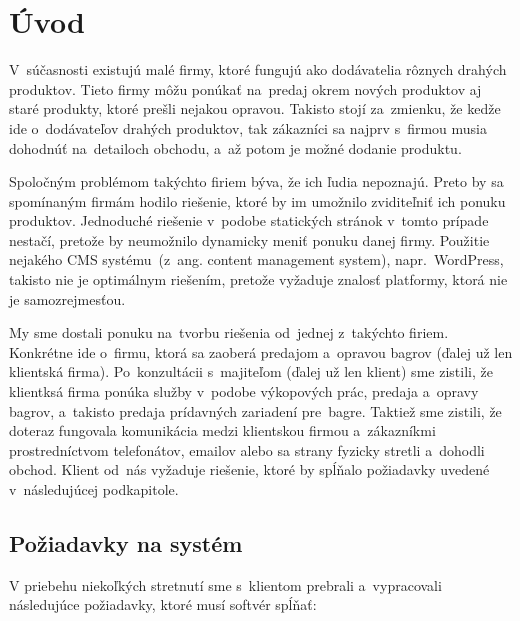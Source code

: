\chapter{Úvod}

V~súčasnosti existujú malé firmy, ktoré fungujú ako dodávatelia rôznych drahých produktov. Tieto firmy môžu ponúkať na~predaj okrem nových produktov aj staré produkty, ktoré prešli nejakou opravou. Takisto stojí za~zmienku, že kedže ide o~dodávateľov drahých produktov, tak zákazníci sa najprv s~firmou musia dohodnúť na~detailoch obchodu, a~až potom je možné dodanie produktu.

Spoločným problémom takýchto firiem býva, že ich ľudia nepoznajú. Preto by sa spomínaným firmám hodilo riešenie, ktoré by im umožnilo zviditeľniť ich ponuku produktov. Jednoduché riešenie v~podobe statických stránok v~tomto prípade nestačí, pretože by neumožnilo dynamicky meniť ponuku danej firmy. Použitie nejakého CMS systému~(z~ang. content management system), napr.~Word\-Press, takisto nie je optimálnym riešením, pretože vyžaduje znalosť platformy, ktorá nie je samozrejmesťou.

My sme dostali ponuku na~tvorbu riešenia od~jednej z~takýchto firiem. Konkrétne ide o~firmu, ktorá sa zaoberá predajom a~opravou bagrov (ďalej už len klientská firma). Po~konzultácii s~majiteľom (ďalej už len klient) sme zistili, že klientksá firma ponúka služby v~podobe výkopových prác, predaja a~opravy bagrov, a~takisto predaja prídavných zariadení pre~bagre. Taktiež sme zistili, že doteraz fungovala komunikácia medzi klientskou firmou a~zákazníkmi prostredníctvom telefonátov, emailov alebo sa strany fyzicky stretli a~dohodli obchod. Klient od~nás vyžaduje riešenie, ktoré by spĺňalo požiadavky uvedené v~následujúcej podkapitole.

\section{Požiadavky na systém}
\label{poziadavky}

V priebehu niekoľkých stretnutí sme s~klientom prebrali a~vypracovali následujúce požiadavky, ktoré musí softvér spĺňať:

